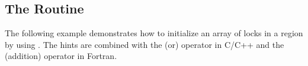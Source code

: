 \pagebreak
\subsection{The  Routine}
\label{subsec:init_lock_with_hint}

The following example demonstrates how to initialize an array of locks in a  region by using .
The hints are combined with the \code{|} (or) operator in C/C++ and the \code{+} (addition) operator in Fortran.



